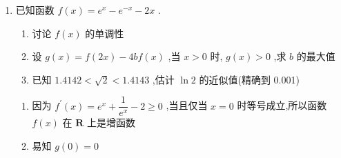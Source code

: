 \begin{enumerate}
\begin{enumerate}
\begin{jieda}
\begin{enumerate}
                当$a \leq \dfrac{1}{2}$时，$g(x) \leq h(x) = x{e}^{\frac{x}{2}} - {e}^{x} + 1$，故$h'(x) = \left(1+\dfrac{x}{2} - \sqrt{e^x}\right)\sqrt{e^x}$，设$m(x) = 1+\dfrac{x}{2} - \sqrt{e^x}$，$m'(x) = \dfrac{1}{2} - \dfrac{1}{2}\sqrt{e^x} < 0$，因此$h'(x) < 0$，故$h(x)$在$(0, +\infty)$严减，故$h(x) < h(0) = 0$

                故$a$最大可取$\dfrac{1}{2}$

                \item $\dfrac{1}{\sqrt{{1}^{2} + 1}} + \dfrac{1}{\sqrt{{2}^{2} + 2}} + \cdots  + \dfrac{1}{\sqrt{{n}^{2} + n}} > \ln \left( {n + 1}\right) \Longleftrightarrow \dfrac{1}{\sqrt{{1}^{2} + 1}} + \dfrac{1}{\sqrt{{2}^{2} + 2}} + \cdots  + \dfrac{1}{\sqrt{{n}^{2} + n}} > (\ln \left( {n + 1}\right) - lnn) + (lnn - ln(n-1)) + ... + (ln2 - ln1)$

                故只需证$\dfrac{1}{\sqrt{{n}^{2} + n}} \geq \ln \left( {n + 1}\right) - lnn = ln\left(1+\dfrac{1}{n}\right)$对$n \in \mathbf{N^*}$恒成立，且等号不恒取等即可.

                根据上一问可知$x{e}^{\frac{x}{2}} - {e}^{x} + 1 < 0$对$x > 0$恒成立，换元$t = {e}^{x}$，即$lnt \cdot \sqrt{t} - t + 1 < 0$对$t > 1$恒成立.

                变形有$lnt < \sqrt{t} - \dfrac{1}{\sqrt{t}}$，令$t = 1+\dfrac{1}{n}$，即有$\dfrac{1}{\sqrt{{n}^{2} + n}} \geq  ln\left(1+\dfrac{1}{n}\right)$，得证.
            \end{enumerate}
        \end{jieda}
        \item 已知函数 $f\left( x\right)  = {e}^{x} - {e}^{-x} - {2x}$ .
        \begin{enumerate}
            \item 讨论 $f\left( x\right)$ 的单调性
            \item 设 $g\left( x\right)  = f\left( {2x}\right)  - {4bf}\left( x\right)$ ,当 $x > 0$ 时, $g\left( x\right)  > 0$ ,求 $b$ 的最大值
            \item 已知 ${1.4142} < \sqrt{2} < {1.4143}$ ,估计 $\ln 2$ 的近似值(精确到 0.001)
        \end{enumerate}
        \begin{jieda}
            \begin{enumerate}
                \item 因为 ${f}^{\prime }\left( x\right)  = {e}^{x} + \dfrac{1}{{e}^{x}} - 2 \geq  0$ ,当且仅当 $x = 0$ 时等号成立,所以函数 $f\left( x\right)$ 在 $\mathbf{R}$ 上是增函数
                \item 易知 $g(0) = 0$
                

\end{enumerate}
\end{jieda}
\end{enumerate}
\end{enumerate}
